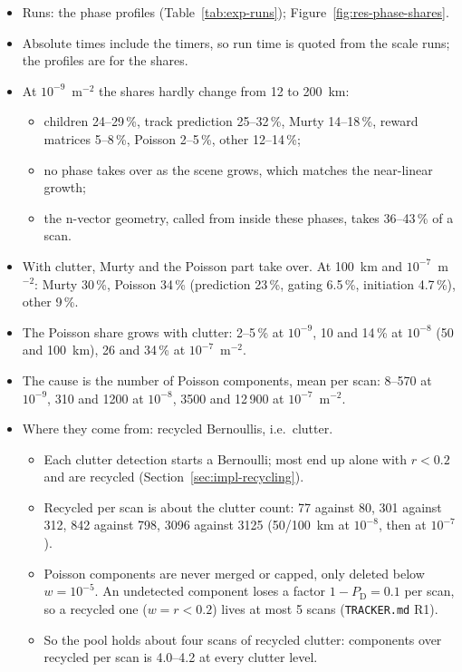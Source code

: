 \begin{itemize}
    \item Runs: the phase profiles (Table~\ref{tab:exp-runs}); Figure~\ref{fig:res-phase-shares}.
    \item Absolute times include the timers, so run time is quoted from the scale runs; the profiles are for the shares.
    \item At $10^{-9}$~m$^{-2}$ the shares hardly change from 12 to 200~km:
    \begin{itemize}
        \item children 24--29\,\%, track prediction 25--32\,\%, Murty 14--18\,\%, reward matrices 5--8\,\%, Poisson 2--5\,\%, other 12--14\,\%;
        \item no phase takes over as the scene grows, which matches the near-linear growth;
        \item the n-vector geometry, called from inside these phases, takes 36--43\,\% of a scan.
    \end{itemize}
    \item With clutter, Murty and the Poisson part take over. At 100~km and $10^{-7}$~m$^{-2}$: Murty 30\,\%, Poisson 34\,\% (prediction 23\,\%, gating 6.5\,\%, initiation 4.7\,\%), other 9\,\%.
    \item The Poisson share grows with clutter: 2--5\,\% at $10^{-9}$, 10 and 14\,\% at $10^{-8}$ (50 and 100~km), 26 and 34\,\% at $10^{-7}$~m$^{-2}$.
    \item The cause is the number of Poisson components, mean per scan: 8--570 at $10^{-9}$, 310 and 1200 at $10^{-8}$, 3500 and 12\,900 at $10^{-7}$~m$^{-2}$.
    \item Where they come from: recycled Bernoullis, i.e.\ clutter.
    \begin{itemize}
        \item Each clutter detection starts a Bernoulli; most end up alone with $r < 0.2$ and are recycled (Section~\ref{sec:impl-recycling}).
        \item Recycled per scan is about the clutter count: 77 against 80, 301 against 312, 842 against 798, 3096 against 3125 (50/100~km at $10^{-8}$, then at $10^{-7}$).
        \item Poisson components are never merged or capped, only deleted below $w = 10^{-5}$. An undetected component loses a factor $1 - P_{\mathrm{D}} = 0.1$ per scan, so a recycled one ($w = r < 0.2$) lives at most 5 scans (\texttt{TRACKER.md} R1).
        \item So the pool holds about four scans of recycled clutter: components over recycled per scan is 4.0--4.2 at every clutter level.

\end{itemize}
\end{itemize}
